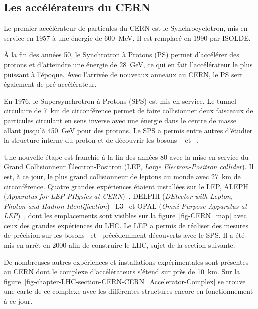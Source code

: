 \subsection{Les accélérateurs du CERN}
Le premier accélérateur de particules du CERN est le Synchrocyclotron, mis en service en 1957 à une énergie de \SI{600}{\MeV}.
Il est remplacé en 1990 par ISOLDE.
\par À la fin des années 50, le Synchrotron à Protons (PS) permet d'accélérer des protons et d'atteindre une énergie de \SI{28}{\GeV}, ce qui en fait l'accélérateur le plus puissant à l'époque.
Avec l'arrivée de nouveaux anneaux au CERN, le PS sert également de pré-accélérateur.
\par En 1976, le Supersynchrotron à Protons (SPS) est mis en service.
Le tunnel circulaire de \SI{7}{\kilo\meter} de circonférence permet de faire collisionner deux faisceaux de particules circulant en sens inverse avec une énergie dans le centre de masse allant jusqu'à \SI{450}{\GeV} pour des protons.
Le SPS a permis entre autres d'étudier la structure interne du proton et de découvrir les bosons
\Wboson~\cite{Wboson_discovery1,Wboson_discovery2,Wboson_discovery3}
et
\Zboson~\cite{Zboson_discovery1,Zboson_discovery2}.
\par Une nouvelle étape est franchie à la fin des années 80 avec la mise en service du Grand Collisionneur Électron-Positron (LEP, \emph{Large Electron-Positron collider}).
Il est, à ce jour, le plus grand collisionneur de leptons au monde avec \SI{27}{\kilo\meter} de circonférence.
Quatre grandes expériences étaient installées sur le LEP,
ALEPH (\emph{Apparatus for LEP PHysics at CERN})~\cite{aleph_paper},
DELPHI (\emph{DEtector with Lepton, Photon and Hadron Identification})~\cite{delphi_paper}
L3~\cite{l3_paper} et
OPAL (\emph{Omni-Purpose Apparatus at LEP})~\cite{opal_paper},
dont les emplacements sont visibles sur la figure~\ref{fig-CERN_map} avec ceux des grandes expériences du LHC.
Le LEP a permis de réaliser des mesures de précision sur les bosons \Wboson\ et \Zboson\ précédemment découverts avec le SPS.
Il a été mis en arrêt en 2000 afin de construire le LHC, sujet de la section suivante.
\par De nombreuses autres expériences et installations expérimentales sont présentes au CERN dont le complexe d'accélérateurs s'étend sur près de \SI{10}{\kilo\meter}.
Sur la figure~\ref{fig-chapter-LHC-section-CERN-CERN_Accelerator-Complex} se trouve une carte de ce complexe avec les différentes structures encore en fonctionnement à ce jour.
